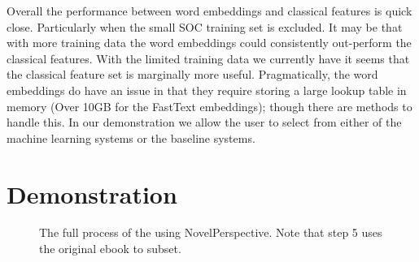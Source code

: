 \documentclass[11pt,a4paper]{article}
\begin{document}
Overall the performance between word embeddings and classical features is quick close.
Particularly when the small SOC training set is excluded.
It may be that with more training data the word embeddings could consistently out-perform the classical features.
With the limited training data we currently have it seems that the classical feature set is marginally more useful.
Pragmatically, the word embeddings do have an issue in that they require storing a large lookup table in memory (Over 10GB for the FastText embeddings); though there are methods to handle this.
In our demonstration we allow the user to select from either of the machine learning systems or the baseline systems.

\section{Demonstration}\label{sec:demonstration}

\begin{figure*}
	\caption{The full process of the using NovelPerspective. Note that step 5 uses the original ebook to subset. \label{fig:fullprocess}
	}
\end{figure*}
\end{document}
